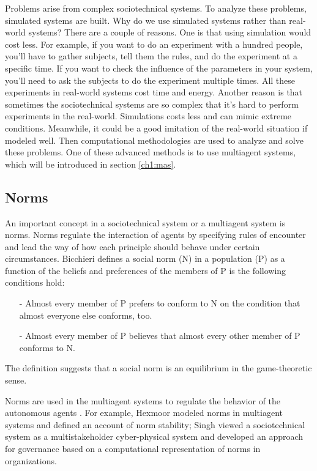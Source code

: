 Problems arise from complex sociotechnical systems. To analyze these problems, simulated systems are built. Why do we use simulated systems rather than real-world systems? There are a couple of reasons. One is that using simulation would cost less. For example, if you want to do an experiment with a hundred people, you'll have to gather subjects, tell them the rules, and do the experiment at a specific time. If you want to check the influence of the parameters in your system, you'll need to ask the subjects to do the experiment multiple times. All these experiments in real-world systems cost time and energy. Another reason is that sometimes the sociotechnical systems are so complex that it's hard to perform experiments in the real-world. Simulations costs less and can mimic extreme conditions. Meanwhile, it could be a good imitation of the real-world situation if modeled well. Then computational methodologies are used to analyze and solve these problems. One of these advanced methods is to use multiagent systems, which will be introduced in section \ref{ch1:mas}.

\subsection{Norms}
\label{ch1:norms}

An important concept in a sociotechnical system or a multiagent system is norms. Norms regulate the interaction of agents by specifying rules of encounter and lead the way of how each principle should behave under certain circumstances. Bicchieri \cite{bicchieri1990} defines a social norm (N) in a population (P) as a function of the beliefs and preferences of the members of P is the following conditions hold:
\begin{itemize}
\item[-]Almost every member of P prefers to conform to N on the condition that almost everyone else conforms, too.
\item[-]Almost every member of P believes that almost every other member of P conforms to N.
\end{itemize}
The definition suggests that a social norm is an equilibrium in the game-theoretic sense.  

Norms are used in the multiagent systems to regulate the behavior of the autonomous agents \cite{boella2009} \cite{hollander2011}. For example, Hexmoor \cite{hexmoor2006} modeled norms in multiagent systems and defined an account of norm stability; Singh \cite{singh2014} viewed a sociotechnical system as a multistakeholder cyber-physical system and developed an approach for governance based on a computational representation of norms in organizations.

